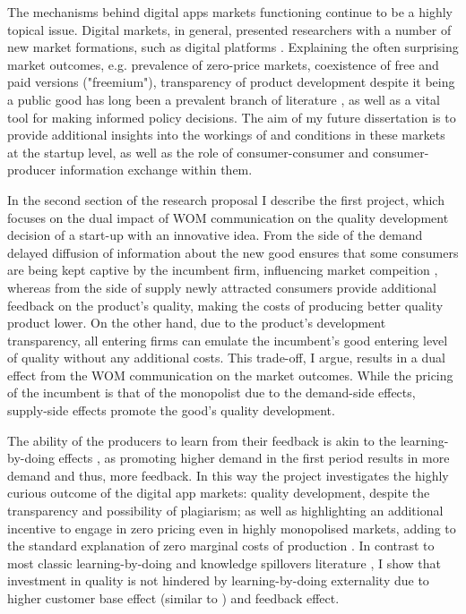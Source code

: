 \documentclass{article}
\numberwithin{figure}{section}
\numberwithin{table}{section}
\theoremstyle{indented}
\numberwithin{equation}{section} %
\begin{document}
The mechanisms behind digital apps markets functioning continue to be a highly topical issue. Digital markets, in general, presented researchers with a number of new market formations, such as digital platforms \citep{Just2018, Choi2021, Appel2020}. Explaining the often surprising market outcomes, e.g. prevalence of zero-price markets, coexistence of free and paid versions ("freemium"), transparency of product development despite it being a public good has long been a prevalent branch of literature \citep{Appel2020, Ajorlou2018}, as well as a vital tool for making informed policy decisions. The aim of my future dissertation is to provide additional insights into the workings of and conditions in these markets at the startup level, as well as the role of consumer-consumer and consumer-producer information exchange within them.

In the second section of the research proposal I describe the first project, which focuses on the dual impact of WOM communication on the quality development decision of a start-up with an innovative idea. From the side of the demand delayed diffusion of information about the new good ensures that some consumers are being kept captive by the incumbent firm, influencing market compeition \citep{Fainmesser2020}, whereas from the side of supply newly attracted consumers provide additional feedback on the product's quality, making the costs of producing better quality product lower. On the other hand, due to the product's development transparency, all entering firms can emulate the incumbent's good entering level of quality without any additional costs. This trade-off, I argue, results in a dual effect from the WOM communication on the market outcomes. While the pricing of the incumbent is that of the monopolist due to the demand-side effects, supply-side effects promote the good's quality development.

The ability of the producers to learn from their feedback is akin to the learning-by-doing effects \citet{Tirole}, as promoting higher demand in the first period results in more demand and thus, more feedback. In this way the project investigates the highly curious outcome of the digital app markets: quality development, despite the transparency and possibility of plagiarism; as well as highlighting an additional incentive to engage in zero pricing even in highly monopolised markets, adding to the standard explanation of zero marginal costs of production \citep{Ajorlou2018, Campbell2015}. In contrast to most classic learning-by-doing and knowledge spillovers literature \citep{Tirole,  Jovanovic1994}, I show that investment in quality is not hindered by learning-by-doing externality due to higher customer base effect (similar to \citet{Jovanovic1994}) and feedback effect.
\end{document}
